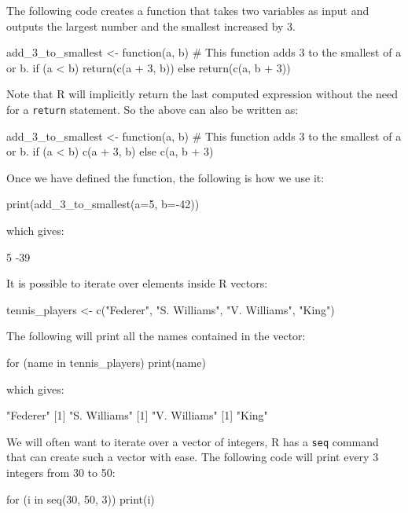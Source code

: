 The following code creates a function that takes two variables as input and
outputs the largest number and the smallest increased by 3.

\begin{Rin}
add_3_to_smallest <- function(a, b) {
  # This function adds 3 to the smallest of a or b.
  if (a < b) {
    return(c(a + 3, b))
  }
  else {
    return(c(a, b + 3))
  }
}
\end{Rin}

Note that R will implicitly return the last computed expression without the need
for a \texttt{return} statement. So the above can also be written as:

\begin{Rin}
add_3_to_smallest <- function(a, b) {
  # This function adds 3 to the smallest of a or b.
  if (a < b) {
    c(a + 3, b)
  }
  else {
    c(a, b + 3)
  }
}
\end{Rin}

Once we have defined the function, the following is how we use it:

\begin{Rin}
print(add_3_to_smallest(a=5, b=-42))
\end{Rin}

which gives:

\begin{Rout}
[1]   5 -39
\end{Rout}

It is possible to iterate over elements inside R vectors:

\begin{Rin}
tennis_players <- c("Federer", "S. Williams", "V. Williams", "King")
\end{Rin}

The following will print all the names contained in the vector:

\begin{Rin}
for (name in tennis_players) {
    print(name)
}
\end{Rin}

which gives:

\begin{Rout}
[1] "Federer"
[1] "S. Williams"
[1] "V. Williams"
[1] "King"
\end{Rout}

We will often want to iterate over a vector of integers, R has a \texttt
{seq}
command that can create such a vector with ease. The following
code will print every 3 integers from 30 to 50:

\begin{Rin}
for (i in seq(30, 50, 3)) {
  print(i)
}
\end{Rin}


